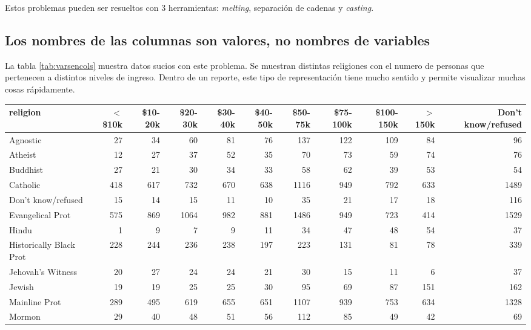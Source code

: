 \documentclass[]{article}
\begin{document}
Estos problemas pueden ser resueltos con 3 herramientas: \emph{melting},
separación de cadenas y \emph{casting}.

\subsection{Los nombres de las columnas son valores, no nombres de
variables}\label{los-nombres-de-las-columnas-son-valores-no-nombres-de-variables}

La tabla \ref{tab:varsencols} muestra datos sucios con este problema. Se
muestran distintas religiones con el numero de personas que pertenecen a
distintos niveles de ingreso. Dentro de un reporte, este tipo de
representación tiene mucho sentido y permite visualizar muchas cosas
rápidamente.

\begin{table}[ht]
\centering
{\tiny
\begin{tabular}{lrrrrrrrrrr}
  \hline
religion & $<$\$10k & \$10-20k & \$20-30k & \$30-40k & \$40-50k & \$50-75k & \$75-100k & \$100-150k & $>$150k & Don't know/refused \\ 
  \hline
Agnostic &  27 &  34 &  60 &  81 &  76 & 137 & 122 & 109 &  84 &  96 \\ 
  Atheist &  12 &  27 &  37 &  52 &  35 &  70 &  73 &  59 &  74 &  76 \\ 
  Buddhist &  27 &  21 &  30 &  34 &  33 &  58 &  62 &  39 &  53 &  54 \\ 
  Catholic & 418 & 617 & 732 & 670 & 638 & 1116 & 949 & 792 & 633 & 1489 \\ 
  Don’t know/refused &  15 &  14 &  15 &  11 &  10 &  35 &  21 &  17 &  18 & 116 \\ 
  Evangelical Prot & 575 & 869 & 1064 & 982 & 881 & 1486 & 949 & 723 & 414 & 1529 \\ 
  Hindu &   1 &   9 &   7 &   9 &  11 &  34 &  47 &  48 &  54 &  37 \\ 
  Historically Black Prot & 228 & 244 & 236 & 238 & 197 & 223 & 131 &  81 &  78 & 339 \\ 
  Jehovah's Witness &  20 &  27 &  24 &  24 &  21 &  30 &  15 &  11 &   6 &  37 \\ 
  Jewish &  19 &  19 &  25 &  25 &  30 &  95 &  69 &  87 & 151 & 162 \\ 
  Mainline Prot & 289 & 495 & 619 & 655 & 651 & 1107 & 939 & 753 & 634 & 1328 \\ 
  Mormon &  29 &  40 &  48 &  51 &  56 & 112 &  85 &  49 &  42 &  69 \\ 

\end{tabular}}
\end{table}
\end{document}
